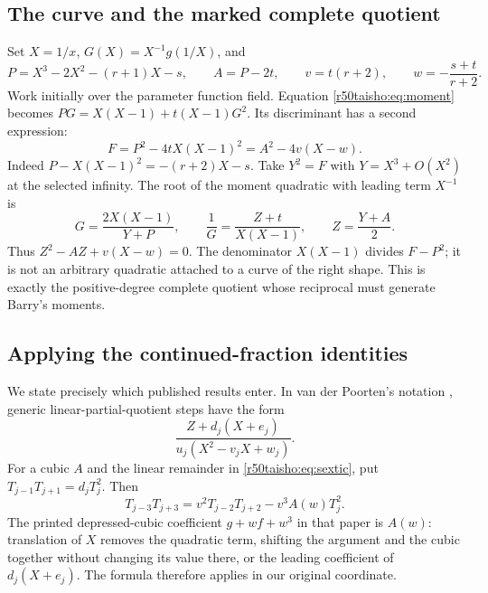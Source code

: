 \documentclass[11pt,a4paper]{article}
\numberwithin{equation}{section}
\theoremstyle{definition}
\theoremstyle{remark}
\begin{document}
\subsection{The curve and the marked complete quotient}
Set $X=1/x$, $G(X)=X^{-1}g(1/X)$, and
\[
 P=X^3-2X^2-(r+1)X-s,\qquad A=P-2t,\qquad
 v=t(r+2),\qquad w=-\frac{s+t}{r+2}.
\]
Work initially over the parameter function field. Equation \eqref{r50taisho:eq:moment}
becomes $P G=X(X-1)+t(X-1)G^2$. Its discriminant has a second expression:
\begin{equation}
 F=P^2-4tX(X-1)^2=A^2-4v(X-w).             \label{r50taisho:eq:sextic}
\end{equation}
Indeed $P-X(X-1)^2=-(r+2)X-s$. Take $Y^2=F$ with
$Y=X^3+O(X^2)$ at the selected infinity. The root of the moment quadratic
with leading term $X^{-1}$ is
\begin{equation}
 G=\frac{2X(X-1)}{Y+P},\qquad
 \frac{1}{G}=\frac{Z+t}{X(X-1)},\qquad Z=\frac{Y+A}{2}. \label{r50taisho:eq:branch}
\end{equation}
Thus $Z^2-AZ+v(X-w)=0$. The denominator $X(X-1)$ divides $F-P^2$;
it is not an arbitrary quadratic attached to a curve of the right shape.
This is exactly the positive-degree complete quotient whose reciprocal
must generate Barry's moments.

\subsection{Applying the continued-fraction identities}
We state precisely which published results enter. In van der Poorten's
notation \cite[Thms.~3.1--3.2 and remarks following Thm.~3.1]{r50taisho:V}, generic
linear-partial-quotient steps have the form
\[
 \frac{Z+d_j(X+e_j)}{u_j (X^2-v_jX+w_j)} .
\]
For a cubic $A$ and the linear remainder in \eqref{r50taisho:eq:sextic}, put
$T_{j-1}T_{j+1}=d_jT_j^2$. Then
\begin{equation}
 T_{j-3}T_{j+3}
    =v^2T_{j-2}T_{j+2}-v^3 A(w) T_j^2.   \label{r50taisho:eq:somos}
\end{equation}
The printed depressed-cubic coefficient $g+wf+w^3$ in that paper is
$A(w)$: translation of $X$ removes the quadratic term, shifting the
argument and the cubic together without changing its value there, or the
leading coefficient of $d_j(X+e_j)$. The formula therefore applies in our
original coordinate.
\end{document}

